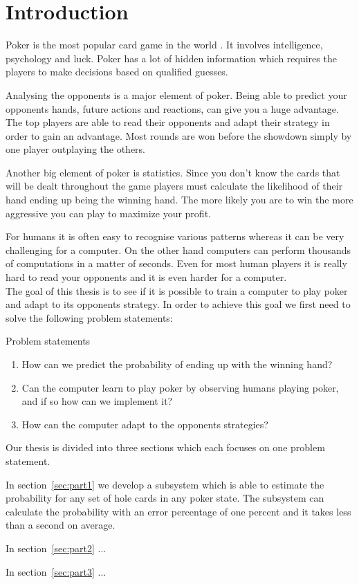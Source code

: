 \section*{Introduction}
Poker is the most popular card game in the world \cite{poker-popular}. It involves intelligence, psychology and luck. Poker has a lot of hidden information which requires the players to make decisions based on qualified guesses.  

Analysing the opponents is a major element of poker. Being able to predict your opponents hands, future actions and reactions, can give you a huge advantage. The top players are able to read their opponents and adapt their strategy in order to gain an advantage. Most rounds are won before the showdown simply by one player outplaying the others. 

Another big element of poker is statistics. Since you don't know the cards that will be dealt throughout the game players must calculate the likelihood of their hand ending up being the winning hand. The more likely you are to win the more aggressive you can play to maximize your profit. 

For humans it is often easy to recognise various patterns whereas it can be very challenging for a computer. On the other hand computers can perform thousands of computations in a matter of seconds. Even for most human players it is really hard to read your opponents and it is even harder for a computer.\\

The goal of this thesis is to see if it is possible to train a computer to play poker and adapt to its opponents strategy. In order to achieve this goal we first need to solve the following problem statements:


\vspace{4mm}
\begin{statementBox2}{Problem statements}
\begin{enumerate}
    \item \label{itm:q1} How can we predict the probability of ending up with the winning hand? 
    \item \label{itm:q2} Can the computer learn to play poker by observing humans playing poker, and if so how can we implement it? 
    \item \label{itm:q3} How can the computer adapt to the opponents strategies?
  \end{enumerate}
\end{statementBox2}
\vspace{4mm}

Our thesis is divided into three sections which each focuses on one problem statement.

In section~\ref{sec:part1} we develop a subsystem which is able to estimate the probability for any set of hole cards in any poker state. The subsystem can calculate the probability with an error percentage of one percent and it takes less than a second on average.

In section~\ref{sec:part2} ...

In section~\ref{sec:part3} ...
